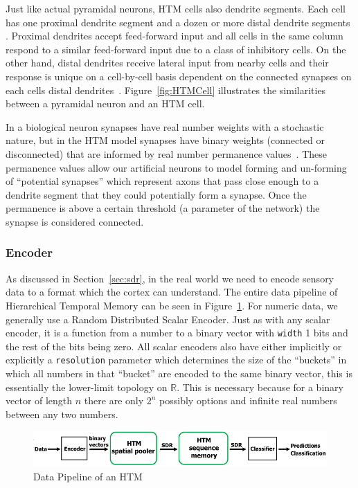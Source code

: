 \documentclass[oneside,12pt,openany]{book}
\begin{document}
	Just like actual pyramidal neurons, HTM cells also dendrite segments. Each cell has one proximal dendrite segment and a dozen or more distal dendrite segments \cite {Whitepaper}. Proximal dendrites accept feed-forward input and all cells in the same column respond to a similar feed-forward input due to a class of inhibitory cells. On the other hand, distal dendrites receive lateral input from nearby cells and their response is unique on a cell-by-cell basis dependent on the connected synapses on each cells distal dendrites~\cite{Whitepaper}. Figure~\ref{fig:HTMCell} illustrates the similarities between a pyramidal neuron and an HTM cell.
	
	In a biological neuron synapses have real number weights with a stochastic nature, but in the HTM model synapses have binary weights (connected or disconnected) that are informed by real number permanence values~\cite{Whitepaper}. These permanence values allow our artificial neurons to model forming and un-forming of ``potential synapses'' which represent axons that pass close enough to a dendrite segment that they could potentially form a synapse. Once the permanence is above a certain threshold (a parameter of the network) the synapse is considered connected.
	
	\subsubsection{Encoder}
	
	As discussed in Section~\ref{sec:sdr}, in the real world we need to encode sensory data to a format which the cortex can understand. The entire data pipeline of Hierarchical Temporal Memory can be seen in Figure~\ref{fig:HTMpipeline}. For numeric data, we generally use a Random Distributed Scalar Encoder. Just as with any scalar encoder, it is a function from a number to a binary vector with \texttt{width} 1 bits and the rest of the bits being zero. All scalar encoders also have either implicitly or explicitly a \texttt{resolution} parameter which determines the size of the ``buckets'' in which all numbers in that ``bucket'' are encoded to the same binary vector, this is essentially the lower-limit topology on $\mathbb{R}$. This is necessary because for a binary vector of length $n$ there are only $2^{n}$ possibly options and infinite real numbers between any two numbers.
	
	\begin{figure}[hbt!]
		\centering
		\includegraphics[width=\linewidth]{images/DataPipeline.jpg}
		\caption[Data Pipeline of an HTM]{Data Pipeline of an HTM~\cite{TheHTMSpatialPooler}}
		\label{fig:HTMpipeline}
	\end{figure}
\end{document}
